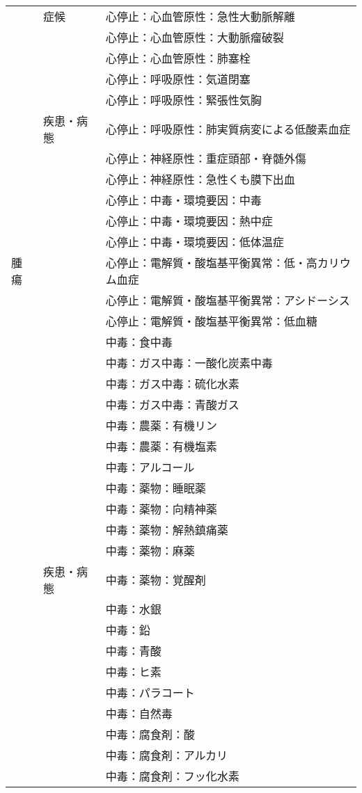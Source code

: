 \begin{xltabular}{\linewidth}{XXX}
 & 症候 & 心停止：心血管原性：急性大動脈解離 \\
 &  & 心停止：心血管原性：大動脈瘤破裂 \\
 &  & 心停止：心血管原性：肺塞栓 \\
 &  & 心停止：呼吸原性：気道閉塞 \\
 &  & 心停止：呼吸原性：緊張性気胸 \\
 & 疾患・病態 & 心停止：呼吸原性：肺実質病変による低酸素血症 \\
 &  & 心停止：神経原性：重症頭部・脊髄外傷 \\
 &  & 心停止：神経原性：急性くも膜下出血 \\
 &  & 心停止：中毒・環境要因：中毒 \\
 &  & 心停止：中毒・環境要因：熱中症 \\
 &  & 心停止：中毒・環境要因：低体温症 \\
腫瘍 &  & 心停止：電解質・酸塩基平衡異常：低・高カリウム血症 \\
 &  & 心停止：電解質・酸塩基平衡異常：アシドーシス \\
 &  & 心停止：電解質・酸塩基平衡異常：低血糖 \\
 &  & 中毒：食中毒 \\
 &  & 中毒：ガス中毒：一酸化炭素中毒 \\
 &  & 中毒：ガス中毒：硫化水素 \\
 &  & 中毒：ガス中毒：青酸ガス \\
 &  & 中毒：農薬：有機リン \\
 &  & 中毒：農薬：有機塩素 \\
 &  & 中毒：アルコール \\
 &  & 中毒：薬物：睡眠薬 \\
 &  & 中毒：薬物：向精神薬 \\
 &  & 中毒：薬物：解熱鎮痛薬 \\
 &  & 中毒：薬物：麻薬 \\
 & 疾患・病態 & 中毒：薬物：覚醒剤 \\
 &  & 中毒：水銀 \\
 &  & 中毒：鉛 \\
 &  & 中毒：青酸 \\
 &  & 中毒：ヒ素 \\
 &  & 中毒：パラコート \\
 &  & 中毒：自然毒 \\
 &  & 中毒：腐食剤：酸 \\
 &  & 中毒：腐食剤：アルカリ \\
 &  & 中毒：腐食剤：フッ化水素 \\

\end{xltabular}
